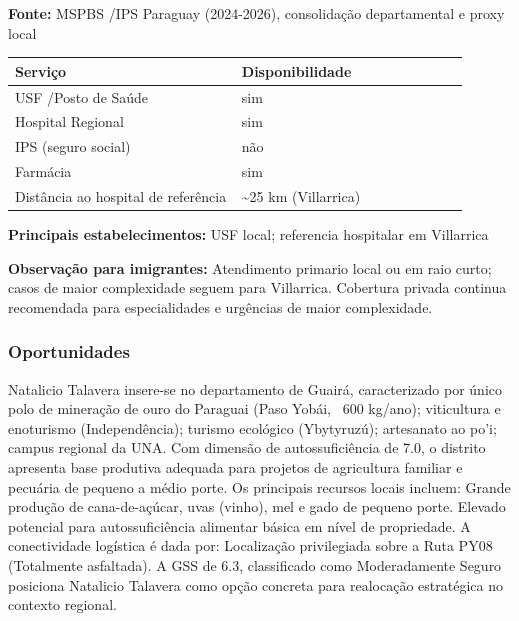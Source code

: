 \textbf{Fonte:} MSPBS /\allowbreak  IPS Paraguay (2024-2026), consolidação
departamental e proxy local

{\def\LTcaptype{none} %
\begin{longtable}{@{}>{\raggedright\arraybackslash}p{0.45\linewidth} >{\raggedright\arraybackslash}p{0.45\linewidth}@{}}
\toprule\noalign{}
Serviço & Disponibilidade \\
\midrule\noalign{}
\endhead
\bottomrule\noalign{}
\endlastfoot
USF /\allowbreak  Posto de Saúde & sim \\
Hospital Regional & sim \\
IPS (seguro social) & não \\
Farmácia & sim \\
Distância ao hospital de referência & \textasciitilde25 km
(Villarrica) \\
\end{longtable}
}

\textbf{Principais estabelecimentos:} USF local; referencia hospitalar
em Villarrica

\textbf{Observação para imigrantes:} Atendimento primario local ou em
raio curto; casos de maior complexidade seguem para Villarrica.
Cobertura privada continua recomendada para especialidades e urgências
de maior complexidade.
\newpage

\subsubsection*{Oportunidades}\label{oport-natalicio-talavera-0412}
Natalicio Talavera insere-se no departamento de Guairá, caracterizado por único polo de mineração de ouro do Paraguai (Paso Yobái, ~600 kg/ano); viticultura e enoturismo (Independência); turismo ecológico (Ybytyruzú); artesanato ao po'i; campus regional da UNA. Com dimensão de autossuficiência de 7.0, o distrito apresenta base produtiva adequada para projetos de agricultura familiar e pecuária de pequeno a médio porte. Os principais recursos locais incluem: Grande produção de cana-de-açúcar, uvas (vinho), mel e gado de pequeno porte. Elevado potencial para autossuficiência alimentar básica em nível de propriedade. A conectividade logística é dada por: Localização privilegiada sobre a Ruta PY08 (Totalmente asfaltada). A GSS de 6.3, classificado como Moderadamente Seguro posiciona Natalicio Talavera como opção concreta para realocação estratégica no contexto regional.

